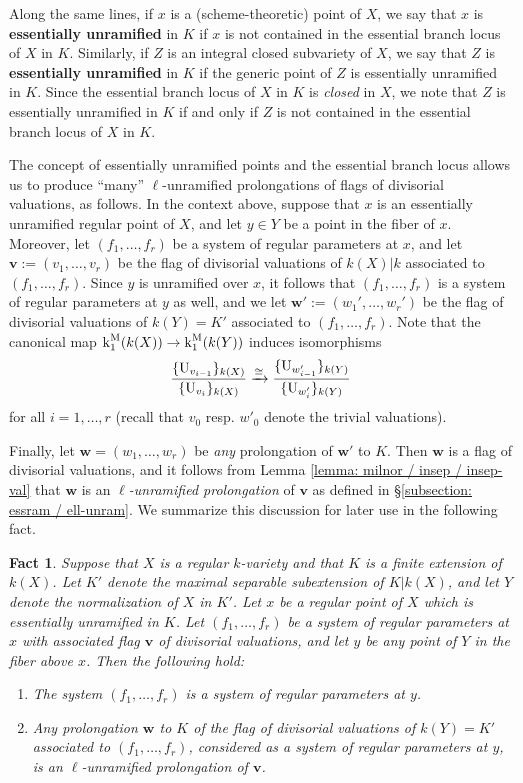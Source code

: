 \documentclass[11pt]{amsart}
\newtheorem{fact}[proposition]{Fact}
\theoremstyle{definition}
\theoremstyle{remark}
\numberwithin{equation}{section}
\newcommand{\U}{{\rm U}}
\newcommand{\vbf}{\mathbf{v}}
\newcommand{\wbf}{\mathbf{w}}
\renewcommand{\k}{\operatorname{k}^{\rm M}}
\begin{document}
Along the same lines, if $x$ is a (scheme-theoretic) point of $X$, we say that $x$ is {\bf essentially unramified} in $K$ if $x$ is not contained in the essential branch locus of $X$ in $K$.
Similarly, if $Z$ is an integral closed subvariety of $X$, we say that $Z$ is {\bf essentially unramified} in $K$ if the generic point of $Z$ is essentially unramified in $K$.
Since the essential branch locus of $X$ in $K$ is \emph{closed} in $X$, we note that $Z$ is essentially unramified in $K$ if and only if $Z$ is not contained in the essential branch locus of $X$ in $K$.

The concept of essentially unramified points and the essential branch locus allows us to produce ``many'' $\ell$-unramified prolongations of flags of divisorial valuations, as follows.
In the context above, suppose that $x$ is an essentially unramified regular point of $X$, and let $y \in Y$ be a point in the fiber of $x$.
Moreover, let $(f_1,\ldots,f_r)$ be a system of regular parameters at $x$, and let $\vbf := (v_1,\ldots,v_r)$ be the flag of divisorial valuations of $k(X)|k$ associated to $(f_1,\ldots,f_r)$.
Since $y$ is unramified over $x$, it follows that $(f_1,\ldots,f_r)$ is a system of regular parameters at $y$ as well, and we let $\wbf' := (w_1',\ldots,w_r')$ be the flag of divisorial valuations of $k(Y) = K'$ associated to $(f_1,\ldots,f_r)$.
Note that the canonical map $\k_1(k(X)) \rightarrow \k_1(k(Y))$ induces isomorphisms
\[ \frac{\{\U_{v_{i-1}}\}_{k(X)}}{\{\U_{v_i}\}_{k(X)}} \xrightarrow{\cong} \frac{\{\U_{w'_{i-1}}\}_{k(Y)}}{\{\U_{w_i'}\}_{k(Y)}} \]
for all $i = 1,\ldots,r$ (recall that $v_0$ resp. $w'_0$ denote the trivial valuations).

Finally, let $\wbf = (w_1,\ldots,w_r)$ be \emph{any} prolongation of $\wbf'$ to $K$.
Then $\wbf$ is a flag of divisorial valuations, and it follows from Lemma \ref{lemma: milnor / insep / insep-val} that $\wbf$ is an \emph{$\ell$-unramified prolongation} of $\vbf$ as defined in \S\ref{subsection: essram / ell-unram}.
We summarize this discussion for later use in the following fact.

\begin{fact}
\label{fact: essram / essential-branch-locus / essential-branch-fact}
  Suppose that $X$ is a regular $k$-variety and that $K$ is a finite extension of $k(X)$.
  Let $K'$ denote the maximal separable subextension of $K|k(X)$, and let $Y$ denote the normalization of $X$ in $K'$.
  Let $x$ be a regular point of $X$ which is essentially unramified in $K$.
  Let $(f_1,\ldots,f_r)$ be a system of regular parameters at $x$ with associated flag $\vbf$ of divisorial valuations, and let $y$ be any point of $Y$ in the fiber above $x$.
  Then the following hold:
  \begin{enumerate}
    \item The system $(f_1,\ldots,f_r)$ is a system of regular parameters at $y$.
    \item Any prolongation $\wbf$ to $K$ of the flag of divisorial valuations of $k(Y) = K'$ associated to $(f_1,\ldots,f_r)$, considered as a system of regular parameters at $y$, is an $\ell$-unramified prolongation of $\vbf$.
  \end{enumerate}
\end{fact}
\end{document}
